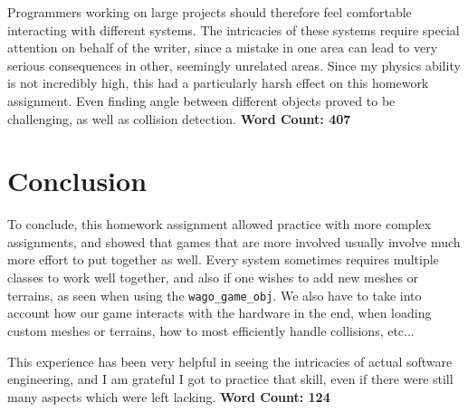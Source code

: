 \documentclass{article}
\begin{document}
	Programmers working on large projects should therefore feel comfortable interacting with different systems. The intricacies of
	these systems require special attention on behalf of the writer, since a mistake in one area can lead to very serious consequences
	in other, seemingly unrelated areas. Since my physics ability is not incredibly high, this had a particularly harsh effect on this
	homework assignment. Even finding angle between different objects proved to be challenging, as well as collision detection.
	\textbf{Word Count: 407}

\section{Conclusion}	
	To conclude, this homework assignment allowed practice with more complex assignments, and showed that games that are more 
	involved usually involve much more effort to put together as well. Every system sometimes requires multiple classes to work 
	well together, and also if one wishes to add new meshes or terrains, as seen when using the \texttt{wago\_game\_obj}. We also 
	have to take into account how our game interacts with the hardware in the end, when loading custom meshes or terrains, how to 
	most efficiently handle collisions, etc...

	This experience has been very helpful in seeing the intricacies of actual software engineering, and I am grateful I got to 
	practice that skill, even if there were still many aspects which were left lacking. 
	\textbf{Word Count: 124}
\end{document}
